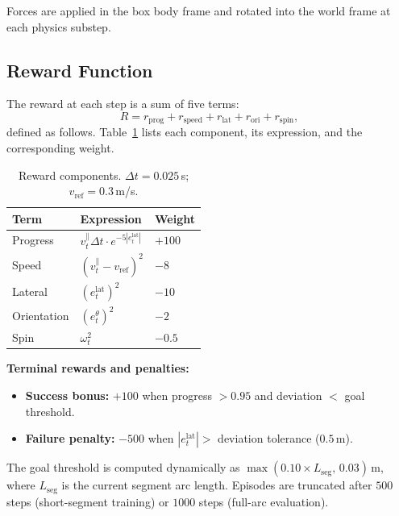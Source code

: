 Forces are applied in the box body frame and rotated into the world frame at each physics substep.

\subsection{Reward Function}

The reward at each step is a sum of five terms:
%
\begin{equation}
    R = r_{\text{prog}} + r_{\text{speed}} + r_{\text{lat}} + r_{\text{ori}} + r_{\text{spin}},
\end{equation}
%
defined as follows.
Table~\ref{tab:reward} lists each component, its expression, and the corresponding weight.

\begin{table}[h]
\centering
\caption{Reward components. $\Delta t = 0.025$\,s; $v_{\mathrm{ref}} = 0.3$\,m/s.}
\label{tab:reward}
\small
\begin{tabular}{lll}
\toprule
\textbf{Term} & \textbf{Expression} & \textbf{Weight} \\
\midrule
Progress  & $v^{\parallel}_t \Delta t \cdot e^{-5|e^{\mathrm{lat}}_t|}$ & $+100$ \\
Speed     & $(v^{\parallel}_t - v_{\mathrm{ref}})^2$       & $-8$   \\
Lateral   & $(e^{\mathrm{lat}}_t)^2$                        & $-10$  \\
Orientation & $(e^{\theta}_t)^2$                             & $-2$   \\
Spin      & $\omega_t^2$                                    & $-0.5$ \\
\bottomrule
\end{tabular}
\end{table}

\noindent\textbf{Terminal rewards and penalties:}
\begin{itemize}
    \item \textbf{Success bonus:} $+100$ when progress $> 0.95$ and deviation $<$ goal threshold.
    \item \textbf{Failure penalty:} $-500$ when $|e^{\mathrm{lat}}_t| >$ deviation tolerance ($0.5$\,m).
\end{itemize}

The goal threshold is computed dynamically as $\max(0.10 \times L_{\mathrm{seg}},\, 0.03)$\,m, where $L_{\mathrm{seg}}$ is the current segment arc length.
Episodes are truncated after $500$ steps (short-segment training) or $1000$ steps (full-arc evaluation).


